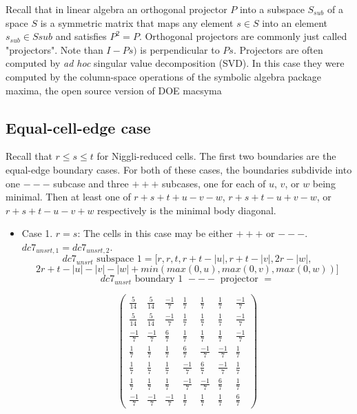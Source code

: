 \documentclass[preprint]{iucr}              %
\begin{document}
{ Recall that in linear algebra an orthogonal projector $P$ into a subspace $S_{sub}$ of
 a space $S$ is a symmetric matrix that maps any element $s \in S$ into an element
 $s_{sub} \in S{sub}$ and satisfies $P^2=P$.  Orthogonal projectors are
 commonly just called "projectors".  Note than ${I-P}s)$ is perpendicular to
 $Ps$.  Projectors are often computed by {\it ad hoc} singular value decomposition (SVD).  In
 this case they were computed by the column-space operations of the
 symbolic algebra package maxima, the open source version of DOE macsyma \cite{bogen1974macsyma}
 
 \subsection{Equal-cell-edge case}
 
 Recall that $r \leq s \leq t$ for Niggli-reduced cells.  The first two boundaries are the equal-edge boundary cases.  For both of these cases, the boundaries subdivide
 into one $---$ subcase and three $+++$ subcases, one for each of $u$, $v$, or $w$
 being minimal.  Then at least one of $r+s+t+u-v-w$, $r+s+t-u+v-w$, or $r+s+t-u-v+w$ respectively
 is the minimal body diagonal.
 
 \begin{itemize}
     \item{Case 1. $r=s$:  The cells in this case may be either $+++$ or $---$.\\
     $dc7_{unsrt,1}=dc7_{unsrt,2}$.
     \[dc7_{unsrt}  \text{ subspace 1}=[r,r,t,r+t-|u|,r+t-|v|,2r-|w|,\]
     \[2r+t-|u|-|v|-|w|+min(max(0,u),max(0,v),max(0,w))]\]
         \[dc7_{unsrt} \text{ boundary 1 }---\text{ projector } =\]
\begin{center}
\begin{equation*}
\begin{pmatrix}
\frac{5}{14}&\frac{5}{14}&\frac{-1}{7}&\frac{1}{7}
&\frac{1}{7}&\frac{1}{7}&\frac{-1}{7}\\[.25em]
\frac{5}{14}&\frac{5}{14}&\frac{-1}{7}&\frac{1}{7}
&\frac{1}{7}&\frac{1}{7}&\frac{-1}{7}\\[.25em]
\frac{-1}{7}&\frac{-1}{7}&\frac{6}{7}&\frac{1}{7}
&\frac{1}{7}&\frac{1}{7}&\frac{-1}{7}\\[.25em]
\frac{1}{7}&\frac{1}{7}&\frac{1}{7}&\frac{6}{7}&\frac{-1}{7}
&\frac{-1}{7}&\frac{1}{7}\\[.25em]
\frac{1}{7}&\frac{1}{7}&\frac{1}{7}&\frac{-1}{7}&\frac{6}{7}
&\frac{-1}{7}&\frac{1}{7}\\[.25em]
\frac{1}{7}&\frac{1}{7}&\frac{1}{7}&\frac{-1}{7}&\frac{-1}{7}
&\frac{6}{7}&\frac{1}{7}\\[.25em]
\frac{-1}{7}&\frac{-1}{7}&\frac{-1}{7}&\frac{1}{7}
&\frac{1}{7}&\frac{1}{7}&\frac{6}{7}
\end{pmatrix}
\end{equation*}
\end{center}

}
\end{itemize}}
\end{document}
